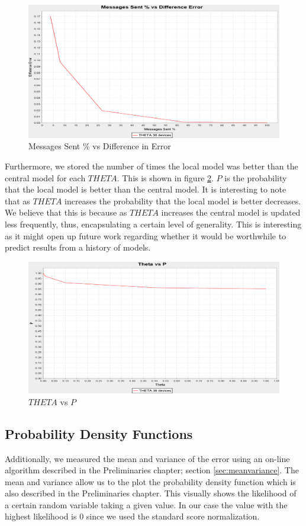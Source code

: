 \documentclass{mproj}
\begin{document}
\begin{figure}[H]
\caption{Messages Sent \% vs Difference in Error}
\label{fig:MessagesDe}
\centerline{\includegraphics[scale=0.3]{MessagesDe}}
\end{figure}

Furthermore, we stored the number of times the local model was better than the central model for each $THETA$. This is shown in figure \ref{fig:thetaP}. $P$ is the probability that the local model is better than the central model. It is interesting to note that as $THETA$ increases the probability that the local model is better decreases. We believe that this is because as $THETA$ increases the central model is updated less frequently, thus, encapsulating a certain level of generality. This is interesting as it might open up future work regarding whether it would be worthwhile to predict results from a history of models.

\begin{figure}[H]
\caption{$THETA$ vs $P$}
\label{fig:thetaP}
\centerline{\includegraphics[scale=0.3]{thetaP}}
\end{figure}

\subsection{Probability Density Functions}
Additionally, we measured the mean and variance of the error using an on-line algorithm described in the Preliminaries chapter; section \ref{sec:meanvariance}. The mean and variance allow us to the plot the probability density function which is also described in the Preliminaries chapter. This visually shows the likelihood of a certain random variable taking a given value. In our case the value with the highest likelihood is 0 since we used the standard score normalization.
\end{document}
